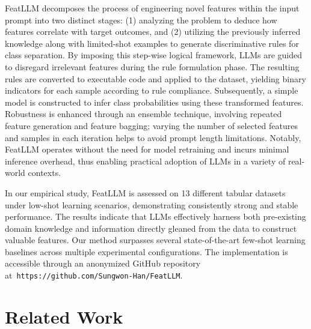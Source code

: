 \textsf{FeatLLM} decomposes the process of engineering novel features within the input prompt into two distinct stages: (1) analyzing the problem to deduce how features correlate with target outcomes, and (2) utilizing the previously inferred knowledge along with limited-shot examples to generate discriminative rules for class separation. By imposing this step-wise logical framework, LLMs are guided to disregard irrelevant features during the rule formulation phase. The resulting rules are converted to executable code and applied to the dataset, yielding binary indicators for each sample according to rule compliance. Subsequently, a simple model is constructed to infer class probabilities using these transformed features. Robustness is enhanced through an ensemble technique, involving repeated feature generation and feature bagging; varying the number of selected features and samples in each iteration helps to avoid prompt length limitations. Notably, \textsf{FeatLLM} operates without the need for model retraining and incurs minimal inference overhead, thus enabling practical adoption of LLMs in a variety of real-world contexts.

In our empirical study, \textsf{FeatLLM} is assessed on 13 different tabular datasets under low-shot learning scenarios, demonstrating consistently strong and stable performance. The results indicate that LLMs effectively harness both pre-existing domain knowledge and information directly gleaned from the data to construct valuable features. Our method surpasses several state-of-the-art few-shot learning baselines across multiple experimental configurations. The implementation is accessible through an anonymized GitHub repository at~\texttt{https://github.com/Sungwon-Han/FeatLLM}.

\section{Related Work}

